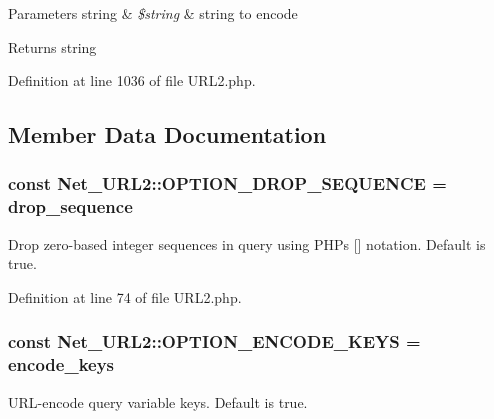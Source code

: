 \begin{DoxyParams}[1]{Parameters}
string & {\em \$string} & string to encode\\
\hline
\end{DoxyParams}
\begin{DoxyReturn}{Returns}
string 
\end{DoxyReturn}


Definition at line 1036 of file U\+R\+L2.\+php.



\subsection{Member Data Documentation}
\subsubsection[{\texorpdfstring{O\+P\+T\+I\+O\+N\+\_\+\+D\+R\+O\+P\+\_\+\+S\+E\+Q\+U\+E\+N\+CE}{OPTION_DROP_SEQUENCE}}]{\setlength{\rightskip}{0pt plus 5cm}const Net\+\_\+\+U\+R\+L2\+::\+O\+P\+T\+I\+O\+N\+\_\+\+D\+R\+O\+P\+\_\+\+S\+E\+Q\+U\+E\+N\+CE = \textquotesingle{}drop\+\_\+sequence\textquotesingle{}}\hypertarget{classNet__URL2_af415684f1d85246c1132203142b86499}{}\label{classNet__URL2_af415684f1d85246c1132203142b86499}
Drop zero-\/based integer sequences in query using P\+HP\textquotesingle{}s \mbox{[}\mbox{]} notation. Default is true. 

Definition at line 74 of file U\+R\+L2.\+php.

\subsubsection[{\texorpdfstring{O\+P\+T\+I\+O\+N\+\_\+\+E\+N\+C\+O\+D\+E\+\_\+\+K\+E\+YS}{OPTION_ENCODE_KEYS}}]{\setlength{\rightskip}{0pt plus 5cm}const Net\+\_\+\+U\+R\+L2\+::\+O\+P\+T\+I\+O\+N\+\_\+\+E\+N\+C\+O\+D\+E\+\_\+\+K\+E\+YS = \textquotesingle{}encode\+\_\+keys\textquotesingle{}}\hypertarget{classNet__URL2_ae06ebc991de4ffe92644c5a8d37ad5ac}{}\label{classNet__URL2_ae06ebc991de4ffe92644c5a8d37ad5ac}
U\+R\+L-\/encode query variable keys. Default is true. 

